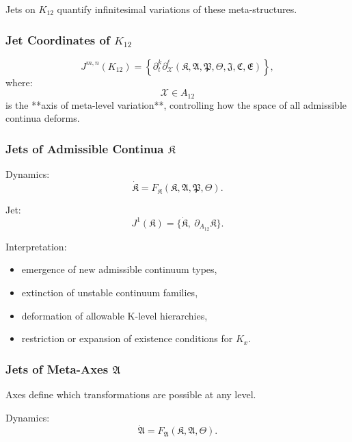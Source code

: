 Jets on $K_{12}$ quantify infinitesimal variations of these meta-structures.


\subsubsection{Jet Coordinates of $K_{12}$}

\[
J^{m,n}(K_{12}) =
\left\{
\partial_t^k \partial_{\mathcal{X}}^\ell 
(\mathfrak{K},\mathfrak{A},\mathfrak{P},\mathfrak{\Theta},\mathfrak{J},\mathfrak{C},\mathfrak{E})
\right\},
\]
where:
\[
\mathcal{X} \in A_{12}
\]
is the **axis of meta-level variation**, controlling how the space of all admissible continua deforms.


\subsubsection{Jets of Admissible Continua $\mathfrak{K}$}

Dynamics:
\[
\dot{\mathfrak{K}}
=
F_{\mathfrak{K}}(\mathfrak{K},\mathfrak{A},\mathfrak{P},\mathfrak{\Theta}).
\]

Jet:
\[
J^1(\mathfrak{K})
= \{\dot{\mathfrak{K}},\ \partial_{A_{12}}\mathfrak{K}\}.
\]

Interpretation:
\begin{itemize}
    \item emergence of new admissible continuum types,
    \item extinction of unstable continuum families,
    \item deformation of allowable K-level hierarchies,
    \item restriction or expansion of existence conditions for $K_x$.
\end{itemize}


\subsubsection{Jets of Meta-Axes $\mathfrak{A}$}

Axes define which transformations are possible at any level.

Dynamics:
\[
\dot{\mathfrak{A}}
=
F_{\mathfrak{A}}(\mathfrak{K},\mathfrak{A},\mathfrak{\Theta}).
\]

